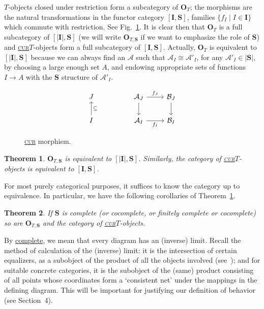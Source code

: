 \documentclass[10pt,a4paper,twocolumn]{article}
\newtheorem{theorem}{Theorem}
\newcommand{\A}{\mathcal{A}}          %
\newcommand{\B}{\mathcal{B}}         %
\newcommand{\CUR}{\underline{\textsc{cur}}\xspace}
\newcommand{\Ocat}{\mathbf{O}}          %
\newcommand{\Tcat}{\Ocat_{T}}      %
\newcommand{\Scat}{\mathbf{S}}          %
\newcommand{\Iset}{\mathbf{I}}          %
\begin{document}
$T$-objects closed under restriction form a subcategory of $\Tcat$; the morphisms are the natural transformations in the functor category $[\Iset,\Scat]$, families $\{f_{I}\mid I\in\Iset\}$ which commute with restriction.
See Fig.~\ref{fig:cur-morphism}.
It is clear then that $\Tcat$ is a full subcategory of $[|\Iset|,\Scat]$ (we will write $\Ocat_{T,\Scat}$ if we want to emphasize the role of $\Scat$) and \CUR $T$-objects form a full subcategory of $[\Iset,\Scat]$.
Actually, $\Tcat$ is equivalent to $[|\Iset|,\Scat]$ because we can always find an $\A$ such that $\A_{I} \cong \A'_{I}$, for any $\A'_{I}\in|\Scat|$, by choosing a large enough set $A$, and endowing appropriate sets of functions $I\to A$ with the $\Scat$ structure of $\A'_{I}$.

\begin{figure}
	\begin{equation*}
		\begin{tikzcd}
			J && {\A_J} & {\B_J} \\
			I && {\A_I} & {\B_I}
			\arrow["{f_J}", from=1-3, to=1-4]
			\arrow[from=1-3, to=2-3]
			\arrow[from=1-4, to=2-4]
			\arrow["\subseteq"', from=2-1, to=1-1]
			\arrow["{f_I}"', from=2-3, to=2-4]
		\end{tikzcd}
	\end{equation*}
	\caption{\footnotesize \CUR morphism.}%
	\label{fig:cur-morphism}
\end{figure}

\begin{theorem}\label{thm:equivalence}
$\Ocat_{T,\Scat}$ is equivalent to $[|\Iset|,\Scat]$.
Similarly, the category of \CUR $T$-objects is equivalent to $[\Iset,\Scat]$.
\end{theorem}

For most purely categorical purposes, it suffices to know the category up to equivalence.
In particular, we have the following corollaries of Theorem~\ref{thm:equivalence}.

\begin{theorem}\label{thm:completeness}
If $\Scat$ is complete (or cocomplete, or finitely complete or cocomplete) so are $\Ocat_{T,\Scat}$ and the category of \CUR $T$-objects.
\end{theorem}

By \underline{complete}, we mean that every diagram has an (inverse) limit.
Recall the method of calculation of the (inverse) limit: it is the intersection of certain equalizers, as a subobject of the product of all the objects involved (see~\cite[p.~47]{Mitchell}); and for suitable concrete categories, it is the subobject of the (same) product consisting of all points whose coordinates form a `consistent net' under the mappings in the defining diagram.
This will be important for justifying our definition of behavior (see Section~4).
\end{document}
